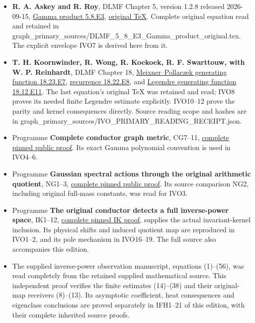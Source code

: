 \begin{itemize}
\tightlist
\item
  \textbf{R. A. Askey and R. Roy}, DLMF Chapter 5, version 1.2.8 released 2026-09-15, \href{https://dlmf.nist.gov/5.8.E3}{Gamma product 5.8.E3}, \href{https://dlmf.nist.gov/5.8.E3.tex}{original TeX}. Complete original equation read and retained in graph\_primary\_sources/DLMF\_5\_8\_E3\_Gamma\_product\_original.tex. The explicit envelope IVO7 is derived here from it.
\item
  \textbf{T. H. Koornwinder, R. Wong, R. Koekoek, R. F. Swarttouw, with W. P. Reinhardt}, DLMF Chapter 18, \href{https://dlmf.nist.gov/18.23.E7}{Meixner--Pollaczek generating function 18.23.E7}, \href{https://dlmf.nist.gov/18.22.E8}{recurrence 18.22.E8}, and \href{https://dlmf.nist.gov/18.12.E11}{Legendre generating function 18.12.E11}. The last equation's original TeX was retained and read; IVO8 proves its needed finite Legendre estimate explicitly. IVO10--12 prove the parity and kernel consequences directly. Source reading scope and hashes are in graph\_primary\_sources/IVO\_PRIMARY\_READING\_RECEIPT.json.
\item
  Programme \textbf{Complete conductor graph metric}, CG7--11, \href{https://github.com/KokunoYumeto/zeta-function-research-reader/blob/0fd693c844aad9117e30ec447c59864a28af10f3/workbenches/splitzero-tandem/continuations/20260921-native-spectral-real-pair/003/COMPLETE_CONDUCTOR_GRAPH_METRIC.tex}{complete pinned public proof}. Its exact Gamma polynomial convention is used in IVO4--6.
\item
  Programme \textbf{Gaussian spectral actions through the original arithmetic quotient}, NG1--3, \href{https://github.com/KokunoYumeto/zeta-function-research-reader/blob/5992ad50c0f2a06921f1fcaded7b4e38097c0739/workbenches/splitzero-tandem/continuations/20260920-original-kernel-mixed-determinants/providers/NATIVE_GAUSSIAN_TRANSFER.tex\#L32}{complete pinned public proof}. Its source comparison NG2, including original full-mass constants, was read for IVO3.
\item
  Programme \textbf{The original conductor detects a full inverse-power space}, IK1--12, \href{https://github.com/KokunoYumeto/zeta-function-research-reader/blob/689a8f87e9c12b7a99b01b3123438c6751ee608f/workbenches/splitzero-tandem/continuations/20260921-directional-inverse-power/007/INVERSE_POWER_CONDUCTOR_OBSERVABILITY.tex}{complete pinned IK proof}, supplies the actual invariant-kernel inclusion. Its physical shifts and induced quotient map are reproduced in IVO1--2, and its pole mechanism in IVO16--19. The full source also accompanies this edition.
\item
  The supplied inverse-power observation manuscript, equations (1)--(56), was read completely from the retained supplied mathematical source. This independent proof verifies the finite estimates (14)--(38) and their original-map receivers (8)--(13). Its asymptotic coefficient, heat consequences and eigenclass conclusions are proved separately in IFH1--21 of this edition, with their complete inherited source proofs.
\end{itemize}
